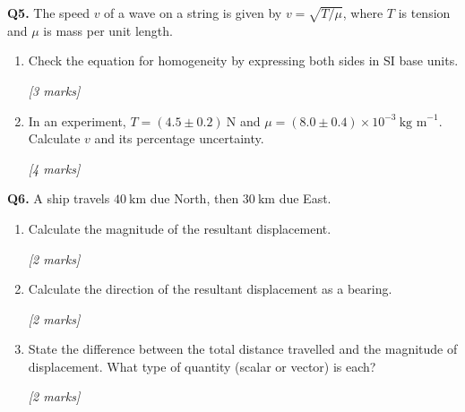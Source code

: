 \begin{tcolorbox}[colback=white, colframe=midblue, breakable]

\begin{minipage}{\linewidth}
\textbf{Q5.} The speed $v$ of a wave on a string is given by $v = \sqrt{T/\mu}$, where $T$ is tension and $\mu$ is mass per unit length.
\end{minipage}

\begin{enumerate}[label=(\alph*)]
  \item \begin{minipage}[t]{\linewidth}
  Check the equation for homogeneity by expressing both sides in SI base units.
  \par\hfill\textit{[3 marks]}
  \vspace{4cm}
  \end{minipage}

  \item \begin{minipage}[t]{\linewidth}
  In an experiment, $T = (4.5 \pm 0.2)\ \text{N}$ and $\mu = (8.0 \pm 0.4)\times10^{-3}\ \text{kg m}^{-1}$. Calculate $v$ and its percentage uncertainty.
  \par\hfill\textit{[4 marks]}
  \vspace{4.5cm}
  \end{minipage}
\end{enumerate}

\begin{minipage}{\linewidth}
\textbf{Q6.} A ship travels $40\ \text{km}$ due North, then $30\ \text{km}$ due East.

\begin{enumerate}[label=(\alph*)]
  \item Calculate the magnitude of the resultant displacement.
  \par\hfill\textit{[2 marks]}
  \vspace{3cm}

  \item Calculate the direction of the resultant displacement as a bearing.
  \par\hfill\textit{[2 marks]}
  \vspace{3cm}

  \item State the difference between the total distance travelled and the magnitude of displacement. What type of quantity (scalar or vector) is each?
  \par\hfill\textit{[2 marks]}
  \vspace{2.5cm}
\end{enumerate}
\end{minipage}


\end{tcolorbox}
